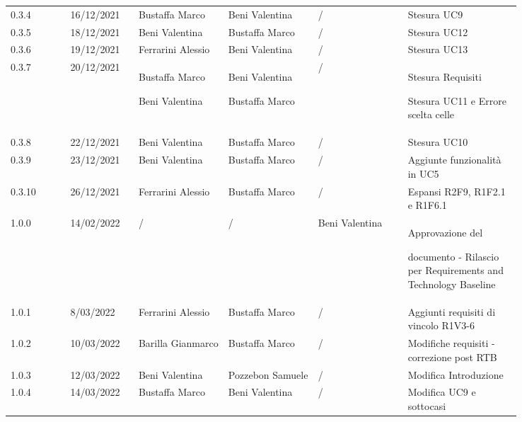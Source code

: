 {\begin{tabular}{p{0.10\linewidth}p{0.10\linewidth}p{0.15\linewidth}p{0.15\linewidth}p{0.15\linewidth}p{0.19\linewidth}}
	\rowcolor[RGB]{233, 245, 206}
	0.3.4 & 16/12/2021 & Bustaffa Marco& Beni Valentina &/& Stesura UC9\\
	\rowcolor[RGB]{216, 235, 171}
	0.3.5 & 18/12/2021 & Beni Valentina& Bustaffa Marco &/& Stesura UC12\\
	\rowcolor[RGB]{233, 245, 206}
	0.3.6 & 19/12/2021 & Ferrarini Alessio& Beni Valentina &/& Stesura UC13\\
	\rowcolor[RGB]{216, 235, 171}
	0.3.7 & 20/12/2021 & Bustaffa Marco \par Beni Valentina & Beni Valentina \par Bustaffa Marco & /& Stesura Requisiti \par Stesura UC11 e Errore scelta celle\\
	\rowcolor[RGB]{233, 245, 206}
	0.3.8 & 22/12/2021 & Beni Valentina& Bustaffa Marco &/& Stesura UC10\\
	\rowcolor[RGB]{216, 235, 171}
	0.3.9 & 23/12/2021 & Beni Valentina& Bustaffa Marco &/& Aggiunte funzionalità in UC5\\
	\rowcolor[RGB]{233, 245, 206}
	0.3.10 & 26/12/2021 & Ferrarini Alessio & Bustaffa Marco &/& Espansi R2F9, R1F2.1 e R1F6.1\\
	\rowcolor[RGB]{216, 235, 171}
	1.0.0 & 14/02/2022 & / & / & Beni Valentina & Approvazione del \par documento - Rilascio per Requirements and Technology Baseline\\
	\rowcolor[RGB]{233, 245, 206}
	1.0.1 & 8/03/2022 & Ferrarini Alessio & Bustaffa Marco  &/& Aggiunti requisiti di vincolo R1V3-6\\
	\rowcolor[RGB]{216, 235, 171}
	1.0.2 & 10/03/2022 & Barilla Gianmarco & Bustaffa Marco & / & Modifiche requisiti - correzione post RTB\\
	\rowcolor[RGB]{233, 245, 206}
	1.0.3 & 12/03/2022 & Beni Valentina & Pozzebon Samuele & / & Modifica Introduzione\\
	\rowcolor[RGB]{216, 235, 171}
	1.0.4 & 14/03/2022 & Bustaffa Marco & Beni Valentina & / & Modifica UC9 e sottocasi\\
\end{tabular}
}
